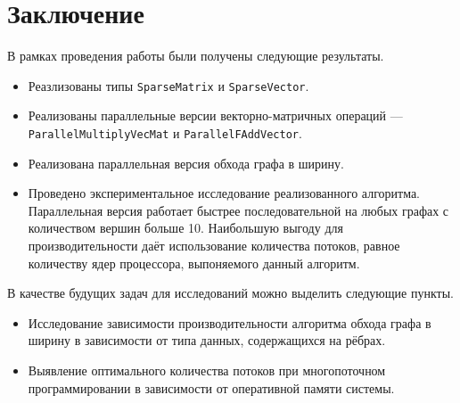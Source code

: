 
\section*{Заключение}
В рамках проведения работы были получены следующие результаты.

\begin{itemize}
\item Реазлизованы типы \texttt{SparseMatrix} и \texttt{SparseVector}.
\item Реализованы параллельные версии векторно-матричных операций --- \texttt{ParallelMultiplyVecMat} и \texttt{ParallelFAddVector}.
\item Реализована параллельная версия обхода графа в ширину.
\item Проведено экспериментальное исследование реализованного алгоритма. Параллельная версия работает быстрее последовательной на любых графах с количеством вершин больше 10. Наибольшую выгоду для производительности даёт использование количества потоков, равное количеству ядер процессора, выпоняемого данный алгоритм.
\end{itemize}
\noindent В качестве будущих задач для исследований можно выделить следующие пункты.
\begin{itemize}
\item Исследование зависимости производительности алгоритма обхода графа в ширину в зависимости от типа данных, содержащихся на рёбрах.
\item Выявление оптимального количества потоков при многопоточном программировании в зависимости от оперативной памяти системы.
\end{itemize}

